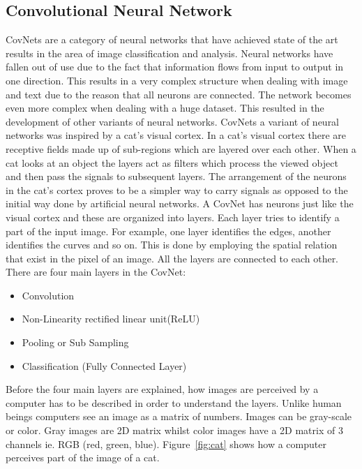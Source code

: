 \documentclass[12pt, a4paper,oneside]{report}
\begin{document}
\subsection{Convolutional Neural Network}
CovNets are a category of neural networks that have achieved state of the art results in the area of image classification and analysis. Neural networks have fallen out of use due to the fact that information flows from input to output in one direction. This results in a very complex structure when dealing with image and text due to the reason that all neurons are connected. The network becomes even more complex when dealing with a huge dataset. This resulted in the development of other variants of neural networks. CovNets a variant of neural networks was inspired by a cat’s visual cortex. In a cat's visual cortex there are receptive fields made up of sub-regions which are layered over each other. When a cat looks at an object the layers act as filters which process the viewed object and then pass the signals to subsequent layers. The arrangement of the neurons in the cat's cortex proves to be a simpler way to carry signals as opposed to the initial way done by artificial neural networks. A CovNet has neurons just like the visual cortex and these are organized into layers. Each layer tries to identify a part of the input image. For example, one layer identifies the edges, another identifies the curves and so on. This is done by employing the spatial relation that exist in the pixel of an image. All the layers are connected to each other. There are four main layers in the CovNet:

\begin{itemize}
	\item Convolution
	\item Non-Linearity rectified linear unit(ReLU)
	\item Pooling or Sub Sampling
	\item Classification (Fully Connected Layer)
\end{itemize} 

Before the four main layers are explained, how images are perceived by a computer has to be described in order to understand the layers. Unlike human beings computers see an image as a matrix of numbers. Images can be gray-scale or color. Gray images are 2D matrix whilst color images have a 2D matrix of 3 channels ie. RGB (red, green, blue). Figure~\ref{fig:cat} shows how a computer perceives part of the image of a cat.
\end{document}
